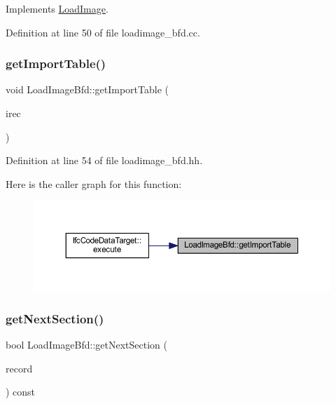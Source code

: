 Implements \mbox{\hyperlink{class_load_image_a5103418147e95994f66e77746c0a0cfc}{Load\+Image}}.



Definition at line 50 of file loadimage\+\_\+bfd.\+cc.

\mbox{\label{class_load_image_bfd_aed37920fc29c5251f29061bf4479e6fc}} 
\subsubsection{\texorpdfstring{getImportTable()}{getImportTable()}}
{\footnotesize\ttfamily void Load\+Image\+Bfd\+::get\+Import\+Table (\begin{DoxyParamCaption}\item[{vector$<$ \mbox{\hyperlink{struct_import_record}{Import\+Record}} $>$ \&}]{irec }\end{DoxyParamCaption})\hspace{0.3cm}{\ttfamily [inline]}}



Definition at line 54 of file loadimage\+\_\+bfd.\+hh.

Here is the caller graph for this function\+:
\nopagebreak
\begin{figure}[H]
\begin{center}
\leavevmode
\includegraphics[width=350pt]{class_load_image_bfd_aed37920fc29c5251f29061bf4479e6fc_icgraph}
\end{center}
\end{figure}
\mbox{\label{class_load_image_bfd_aaae78fac403213f2dc9ebf97ac28a5b2}} 
\subsubsection{\texorpdfstring{getNextSection()}{getNextSection()}}
{\footnotesize\ttfamily bool Load\+Image\+Bfd\+::get\+Next\+Section (\begin{DoxyParamCaption}\item[{\mbox{\hyperlink{struct_load_image_section}{Load\+Image\+Section}} \&}]{record }\end{DoxyParamCaption}) const\hspace{0.3cm}{\ttfamily [virtual]}}



